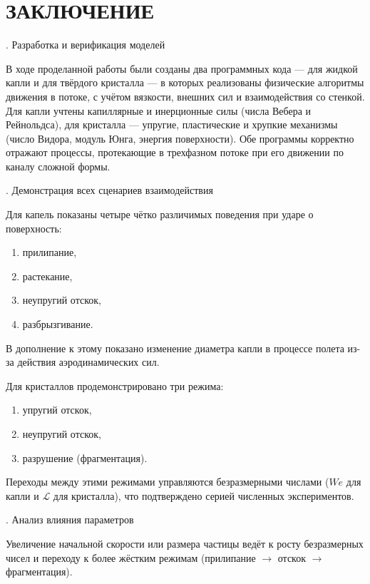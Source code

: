 \chapter*{ЗАКЛЮЧЕНИЕ}

. Разработка и верификация моделей

В ходе проделанной работы были созданы два программных кода — для жидкой капли и для твёрдого кристалла — в которых реализованы физические алгоритмы движения в потоке, с учётом вязкости, внешних сил и взаимодействия со стенкой. Для капли учтены капиллярные и инерционные силы (числа Вебера и Рейнольдса), для кристалла — упругие, пластические и хрупкие механизмы (число Видора, модуль Юнга, энергия поверхности). Обе программы корректно отражают процессы, протекающие в трехфазном потоке при его движении по каналу сложной формы.

. Демонстрация всех сценариев взаимодействия

Для капель показаны четыре чётко различимых поведения при ударе о поверхность:

 \begin{enumerate}
	\item прилипание,
	\item растекание,
	\item неупругий отскок,
	\item разбрызгивание.
\end{enumerate}
В дополнение к этому показано изменение диаметра капли в процессе полета из-за действия аэродинамических сил.

Для кристаллов продемонстрировано три режима:

\begin{enumerate}
	\item упругий отскок,
	\item неупругий отскок,
	\item разрушение (фрагментация).
\end{enumerate}

Переходы между этими режимами управляются безразмерными числами ($We$ для капли и $\mathcal{L}$ для кристалла), что подтверждено серией численных экспериментов.

. Анализ влияния параметров

Увеличение начальной скорости или размера частицы ведёт к росту безразмерных чисел и переходу к более жёстким режимам (прилипание $\rightarrow$ отскок $\rightarrow$ фрагментация).

